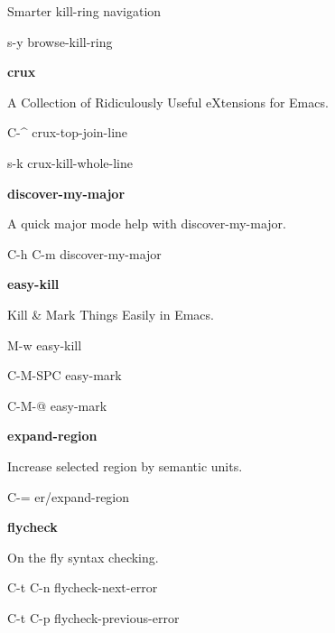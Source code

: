 \documentclass[10pt]{article}
\renewcommand\subsection[1]{\smallskip\par\textbf{\color{heading}#1}}
\newcommand\humanreadable[1]{{\par\color{default}\small\sffamily#1}}
\begin{document}
\begin{multicols}{4}
  \humanreadable{Smarter kill-ring navigation}
  \begin{keylist}
  \item[s-y] browse-kill-ring
  \end{keylist}

  \subsection{crux}

  \humanreadable{A Collection of Ridiculously Useful eXtensions for Emacs.}
  \begin{keylist}
  \item[C-\^] crux-top-join-line
  \item[s-k] crux-kill-whole-line
  \end{keylist}

  \subsection{discover-my-major}
  \humanreadable{A quick major mode help with discover-my-major.}
  \begin{keylist}
  \item[C-h C-m] discover-my-major
  \end{keylist}

  \subsection{easy-kill}
  \humanreadable{Kill \& Mark Things Easily in Emacs.}
  \begin{keylist}
  \item[M-w] easy-kill
  \item[C-M-SPC] easy-mark
  \item[C-M-@] easy-mark
  \end{keylist}

  \subsection{expand-region}
  \humanreadable{Increase selected region by semantic units.}
  \begin{keylist}
  \item[C-=] er/expand-region
  \end{keylist}

  \subsection{flycheck}
  \humanreadable{On the fly syntax checking.}
  \begin{keylist}
  \item[C-t C-n] flycheck-next-error
  \item[C-t C-p] flycheck-previous-error
  \end{keylist}


\end{multicols}
\end{document}
